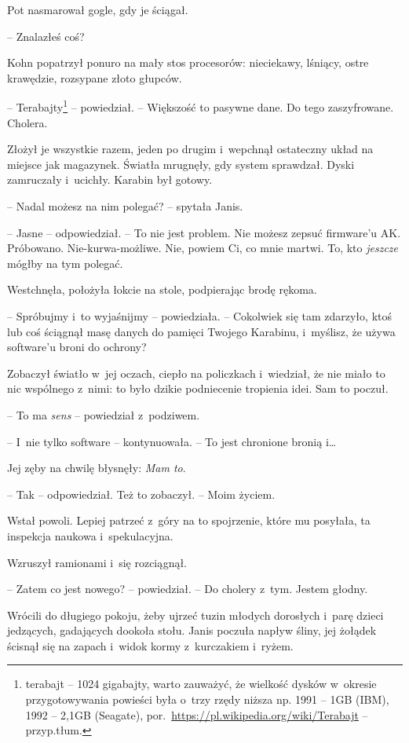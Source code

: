 \documentclass[oneside,polish,11pt,sfheadings]{mwbk}
\begin{document}
Pot nasmarował gogle, gdy je ściągał.

-- Znalazłeś coś?

Kohn popatrzył ponuro na mały stos procesorów: nieciekawy, lśniący,
ostre krawędzie, rozsypane złoto głupców. 

-- Terabajty\footnote{
terabajt -- 1024 gigabajty, warto zauważyć, że wielkość dysków w~okresie
przygotowywania powieści była o~trzy rzędy niższa np. 1991 -- 1GB (IBM),
1992 -- 2,1GB (Seagate),
por.~\url{https://pl.wikipedia.org/wiki/Terabajt} -- przyp.tłum.} -- powiedział.  -- Większość to pasywne dane. Do tego zaszyfrowane.
Cholera.

Złożył je wszystkie razem, jeden po drugim i~wepchnął ostateczny układ
na miejsce jak magazynek. Światła mrugnęły, gdy system sprawdzał. Dyski
zamruczały i~ucichły. Karabin był gotowy.

-- Nadal możesz na nim polegać? -- spytała Janis.

-- Jasne -- odpowiedział. -- To nie jest problem. Nie możesz zepsuć
firmware'u AK. Próbowano. Nie-kurwa-możliwe. Nie, powiem Ci, co mnie
martwi. To, kto \emph{jeszcze} mógłby na tym polegać.

Westchnęła, położyła łokcie na stole, podpierając brodę rękoma. 

-- Spróbujmy i~to wyjaśnijmy -- powiedziała. -- Cokolwiek się tam zdarzyło,
ktoś lub coś ściągnął masę danych do pamięci Twojego Karabinu, i~myślisz, że używa software'u broni do ochrony?

Zobaczył światło w~jej oczach, ciepło na policzkach i~wiedział, że nie
miało to nic wspólnego z~nimi: to było dzikie podniecenie tropienia
idei. Sam to poczuł.

-- To ma \emph{sens} -- powiedział z~podziwem.

-- I~nie tylko software -- kontynuowała. -- To jest chronione bronią i\ldots

Jej zęby na chwilę błysnęły: \emph{Mam to}.

-- Tak -- odpowiedział. Też to zobaczył. -- Moim życiem.

Wstał powoli. Lepiej patrzeć z~góry na to spojrzenie, które mu posyłała,
ta inspekcja naukowa i~spekulacyjna.

Wzruszył ramionami i~się rozciągnął. 

-- Zatem co jest nowego? -- powiedział. -- Do cholery z~tym. Jestem głodny.

Wrócili do długiego pokoju, żeby ujrzeć tuzin młodych dorosłych i~parę
dzieci jedzących, gadających dookoła stołu. Janis poczuła napływ śliny,
jej żołądek ścisnął się na zapach i~widok kormy z~kurczakiem i~ryżem.
\end{document}
